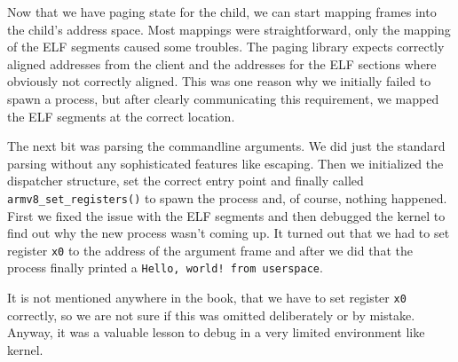 Now that we have paging state for the child, we can start mapping frames into the child's address space.
Most mappings were straightforward, only the mapping of the ELF segments caused some troubles. The 
paging library expects correctly aligned addresses from the client and the addresses for the ELF sections
where obviously not correctly aligned. This was one reason why we initially failed to spawn a process, but
after clearly communicating this requirement, we mapped the ELF segments at the correct location.

The next bit was parsing the commandline arguments. We did just the standard parsing without any sophisticated
features like escaping. Then we initialized the dispatcher structure, set the correct entry point and finally
called \verb|armv8_set_registers()| to spawn the process and, of course, nothing happened. First we fixed the
issue with the ELF segments and then debugged the kernel to find out why the new process wasn't coming up. It
turned out that we had to set register \verb|x0| to the address of the argument frame and after we did that
the process finally printed a \verb|Hello, world! from userspace|.

It is not mentioned anywhere in the book, that we have to set register \verb|x0| correctly, so we are not
sure if this was omitted deliberately or by mistake. Anyway, it was a valuable lesson to debug in a very
limited environment like kernel.

